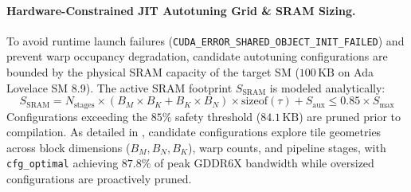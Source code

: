 \paragraph{Hardware-Constrained JIT Autotuning Grid \& SRAM Sizing.}
To avoid runtime launch failures (\texttt{CUDA\_ERROR\_SHARED\_OBJECT\_INIT\_FAILED}) and prevent warp occupancy degradation, candidate autotuning configurations are bounded by the physical SRAM capacity of the target SM ($100\,\text{KB}$ on Ada Lovelace SM 8.9). The active SRAM footprint $S_{\text{SRAM}}$ is modeled analytically:
\begin{equation}
\label{eq:sram_sizing_model}
S_{\text{SRAM}} = N_{\text{stages}} \times \left( B_M \times B_K + B_K \times B_N \right) \times \text{sizeof}(\tau) + S_{\text{aux}} \le 0.85 \times S_{\text{max}}
\end{equation}
Configurations exceeding the $85\%$ safety threshold ($84.1\,\text{KB}$) are pruned prior to compilation. As detailed in , candidate configurations explore tile geometries across block dimensions ($B_M, B_N, B_K$), warp counts, and pipeline stages, with \texttt{cfg\_optimal} achieving $87.8\%$ of peak GDDR6X bandwidth while oversized configurations are proactively pruned.

